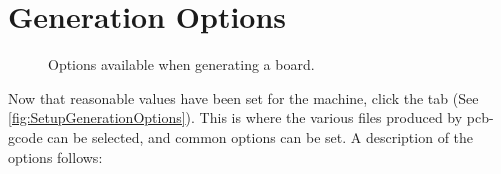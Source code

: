 \documentclass[11pt]{book}
\begin{document}
%
%
\section{Generation Options}\label{sec:GenerationOptions}

\begin{figure}
	\caption{Options available when generating a board.}
	\label{fig:SetupGenerationOptions}
\end{figure}

Now that reasonable values have been set for the machine, click the  tab (See \figurename \vref{fig:SetupGenerationOptions}). This is where the various files produced by pcb-gcode can be selected, and common options can be set. A description of the options follows:
\end{document}

